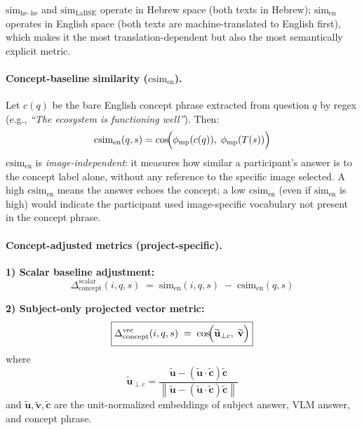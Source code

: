 \documentclass[12pt,a4paper]{article}
\newcommand{\simEN}{\ensuremath{\mathrm{sim}_{\text{en}}}}
\newcommand{\simHH}{\ensuremath{\mathrm{sim}_{\text{he--he}}}}
\newcommand{\simLaBSE}{\ensuremath{\mathrm{sim}_{\text{LaBSE}}}}
\newcommand{\csim}{\ensuremath{\mathrm{csim}_{\text{en}}}}
\newcommand{\SACs}{\ensuremath{\Delta_{\text{concept}}^{\text{scalar}}}}
\newcommand{\SACv}{\ensuremath{\Delta_{\text{concept}}^{\text{vec}}}}
\begin{document}
\simHH{} and \simLaBSE{} operate in Hebrew space (both texts in Hebrew);
\simEN{} operates in English space (both texts are machine-translated to English
first), which makes it the most translation-dependent but also the most
semantically explicit metric.

\paragraph{Concept-baseline similarity (\csim{}).}
Let $c(q)$ be the bare English concept phrase extracted from question $q$ by regex
(e.g., \textit{``The ecosystem is functioning well''}).  Then:
\begin{equation}
  \csim{}(q,s)
    = \cos\!\Bigl(\phi_{\text{mp}}(c(q)),\;
                  \phi_{\text{mp}}(T(s))\Bigr)
  \label{eq:csim}
\end{equation}
\csim{} is \emph{image-independent}: it measures how similar a participant's answer is
to the concept label alone, without any reference to the specific image selected.
A high \csim{} means the answer echoes the concept; a low \csim{} (even if \simEN{}
is high) would indicate the participant used image-specific vocabulary not present in
the concept phrase.

\paragraph{Concept-adjusted metrics (project-specific).}
\textbf{1) Scalar baseline adjustment:}
\begin{equation}
      \boxed{\SACs{}(i,q,s)
            \;=\; \simEN{}(i,q,s)
            \;-\; \csim{}(q,s)}
      \label{eq:sac_scalar}
\end{equation}

\textbf{2) Subject-only projected vector metric:}
\begin{equation}
      \boxed{\SACv{}(i,q,s)
            \;=\;
            \cos\!\Bigl(\widetilde{\mathbf{u}}_{\perp c},\; \widetilde{\mathbf{v}}\Bigr)}
      \label{eq:sac_vec}
\end{equation}
where
\begin{equation}
      \widetilde{\mathbf{u}}_{\perp c}
      =
      \frac{\widetilde{\mathbf{u}} - (\widetilde{\mathbf{u}}\!\cdot\!\widetilde{\mathbf{c}})\widetilde{\mathbf{c}}}
                   {\left\|\widetilde{\mathbf{u}} - (\widetilde{\mathbf{u}}\!\cdot\!\widetilde{\mathbf{c}})\widetilde{\mathbf{c}}\right\|}
\end{equation}
and $\widetilde{\mathbf{u}}, \widetilde{\mathbf{v}}, \widetilde{\mathbf{c}}$ are the
unit-normalized embeddings of subject answer, VLM answer, and concept phrase.
\end{document}
